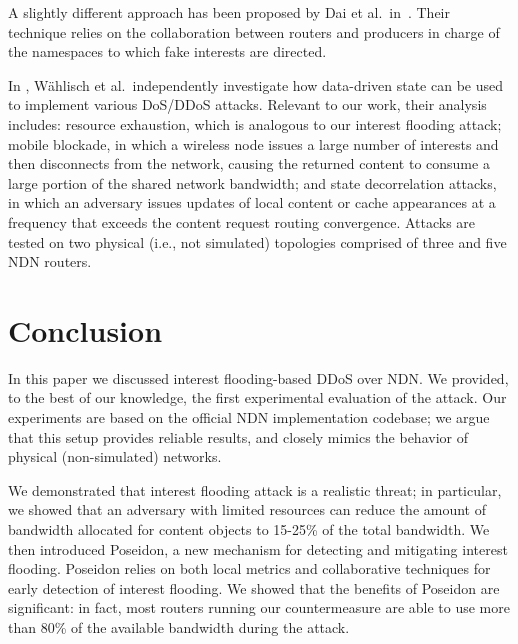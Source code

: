 \documentclass[10pt,conference,letterpaper]{IEEEtran}
\begin{document}
A slightly different approach has been proposed by Dai et al.~in~\cite{NOMENDai}. Their technique 
relies on the collaboration between routers and producers in charge of the namespaces to which fake interests are directed. 

In \cite{WahlishSV12}, W\"ahlisch et al.~independently investigate how data-driven state can be 
used to implement various DoS/DDoS attacks. Relevant to our work, their analysis 
includes: 
resource exhaustion, which is analogous to our interest flooding attack;  
mobile blockade, in which a wireless node issues a large number of interests and then disconnects 
from the network, causing the returned content to consume a large portion of the shared network 
bandwidth;
and state decorrelation attacks, in which an adversary issues updates of local content or cache 
appearances at a frequency that exceeds the content request routing convergence. 
Attacks are tested on two physical (i.e., not simulated) topologies 
comprised of three and five NDN routers.




\section{Conclusion}
\label{sec:conclusion}
In this paper we discussed interest flooding-based DDoS over NDN. We provided, to the best of our knowledge, the first experimental evaluation of the attack. Our experiments are based on the official NDN implementation codebase; we argue that this setup provides reliable results, and closely mimics the behavior of physical (non-simulated) networks. 

We demonstrated that interest flooding attack is a realistic threat; in particular, we showed that an adversary with limited resources can reduce the amount of  bandwidth allocated for content objects to 15-25\% of the total bandwidth.
We then introduced Poseidon, a new mechanism for detecting and mitigating interest flooding. 
Poseidon relies on both local metrics and collaborative techniques for early detection of interest flooding.
We showed that the benefits of Poseidon are significant: in fact, most routers running our countermeasure are able to use more than 80\% of the available bandwidth during the attack.
\vspace{0.5cm}







\balance

{

}
\end{document}
